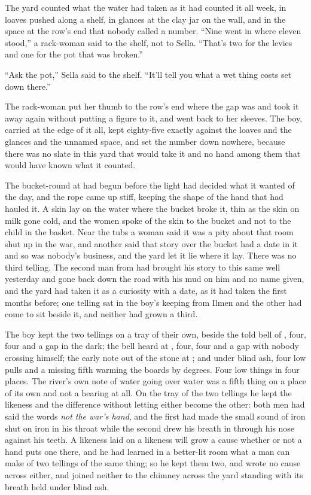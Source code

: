 The yard counted what the water had taken as it had counted it all week, in loaves pushed along a shelf, in glances at the clay jar on the wall, and in the space at the row's end that nobody called a number. “Nine went in where eleven stood,” a rack-woman said to the shelf, not to Sella. “That's two for the levies and one for the pot that was broken.”

“Ask the pot,” Sella said to the shelf. “It'll tell you what a wet thing costs set down there.”

The rack-woman put her thumb to the row's end where the gap was and took it away again without putting a figure to it, and went back to her sleeves. The boy, carried at the edge of it all, kept eighty-five exactly against the loaves and the glances and the unnamed space, and set the number down nowhere, because there was no slate in this yard that would take it and no hand among them that would have known what it counted.

\scenebreak

The bucket-round at  had begun before the light had decided what it wanted of the day, and the rope came up stiff, keeping the shape of the hand that had hauled it. A skin lay on the water where the bucket broke it, thin as the skin on milk gone cold, and the women spoke of the skin to the bucket and not to the child in the basket. Near the tubs a woman said it was a pity about that room shut up in the war, and another said that story over the bucket had a date in it and so was nobody's business, and the yard let it lie where it lay. There was no third telling. The second man from  had brought his story to this same well yesterday and gone back down the road with his mud on him and no name given, and the yard had taken it as a curiosity with a date, as it had taken the first months before; one telling sat in the boy's keeping from Ilmen and the other had come to sit beside it, and neither had grown a third.

The boy kept the two tellings on a tray of their own, beside the told bell of , four, four and a gap in the dark; the bell heard at , four, four and a gap with nobody crossing himself; the early note out of the stone at ; and  under blind ash, four low pulls and a missing fifth warming the boards by degrees. Four low things in four places. The river's own note of water going over water was a fifth thing on a place of its own and not a hearing at all. On the tray of the two tellings he kept the likeness and the difference without letting either become the other: both men had said the words \emph{not the war's hand}, and the first had made the small sound of iron shut on iron in his throat while the second drew his breath in through his nose against his teeth. A likeness laid on a likeness will grow a cause whether or not a hand puts one there, and he had learned in a better-lit room what a man can make of two tellings of the same thing; so he kept them two, and wrote no cause across either, and joined neither to the chimney across the yard standing with its breath held under blind ash.

